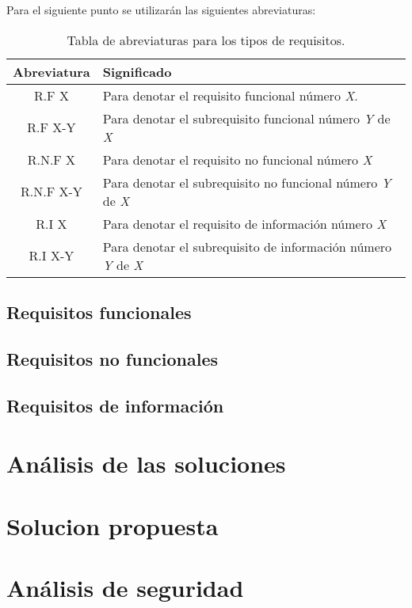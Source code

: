 Para el siguiente punto se utilizarán las siguientes abreviaturas:\\  
\begin{table}[H]
   \centering
   \label{tabla-abreviaturas}
   \begin{tabular}{|c|l|}
   \hline
   \textbf{Abreviatura} & \textbf{Significado} \\ \hline
   R.F X       & Para denotar el requisito funcional número \textit{X}.\\ \hline
   R.F X-Y     & Para denotar el subrequisito funcional número \textit{Y} de \textit{X}\\ \hline
   R.N.F X     & Para denotar el requisito no funcional número \textit{X}\\ \hline
   R.N.F X-Y   & Para denotar el subrequisito no funcional número \textit{Y} de \textit{X}\\ \hline
   R.I X       & Para denotar el requisito de información número \textit{X}\\ \hline
   R.I X-Y     & Para denotar el subrequisito de información número \textit{Y} de \textit{X}\\ \hline
   \end{tabular}
   \caption{Tabla de abreviaturas para los tipos de requisitos.}
\end{table}


\subsection{Requisitos funcionales}

\subsection{Requisitos no funcionales}
\subsection{Requisitos de información}


\section{Análisis de las soluciones}

\section{Solucion propuesta}

\section{Análisis de seguridad}
